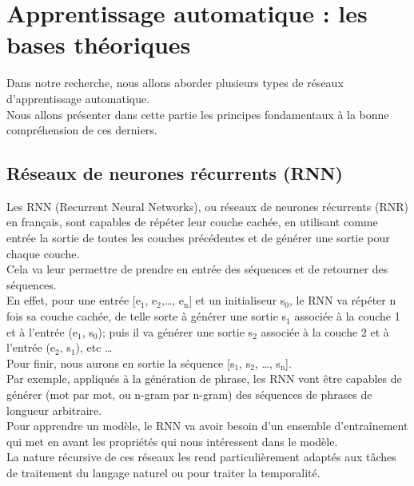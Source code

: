 \documentclass[11pt]{article}
\begin{document}
\newpage
\section{Apprentissage automatique : les bases théoriques}
\label{sec:org206373e}
Dans notre recherche, nous allons aborder plusieurs types de réseaux d'apprentissage automatique.\\
Nous allons présenter dans cette partie les principes fondamentaux à la bonne compréhension de ces derniers.\\

\subsection{Réseaux de neurones récurrents (RNN)}
\label{sec:org334dd82}
Les RNN (Recurrent Neural Networks), ou réseaux de neurones récurrents (RNR) en français, sont capables de répéter leur couche cachée, en utilisant comme entrée la sortie de toutes les couches précédentes et de générer une sortie pour chaque couche.\\
Cela va leur permettre de prendre en entrée des séquences et de retourner des séquences.\\
En effet, pour une entrée [e\(_{\text{1}}\), e\(_{\text{2}}\),\ldots{}, e\(_{\text{n}}\)] et un initialiseur s\(_{\text{0}}\), le RNN va répéter n fois sa couche cachée, de telle sorte à générer une sortie s\(_{\text{1}}\) associée à la couche 1 et à l'entrée (e\(_{\text{1}}\), s\(_{\text{0}}\)); puis il va générer une sortie s\(_{\text{2}}\) associée à la couche 2 et à l'entrée (e\(_{\text{2}}\), s\(_{\text{1}}\)), etc \ldots{}\\
Pour finir, nous aurons en sortie la séquence [s\(_{\text{1}}\), s\(_{\text{2}}\), \ldots{}, s\(_{\text{n}}\)].\\

Par exemple, appliqués à la génération de phrase, les RNN vont être capables de générer (mot par mot, ou n-gram par n-gram) des séquences de phrases de longueur arbitraire.\\

Pour apprendre un modèle, le RNN va avoir besoin d'un ensemble d'entraînement qui met en avant les propriétés qui nous intéressent dans le modèle.\\

La nature récursive de ces réseaux les rend particulièrement adaptés aux tâches de traitement du langage naturel ou pour traiter la temporalité.\\
\end{document}
